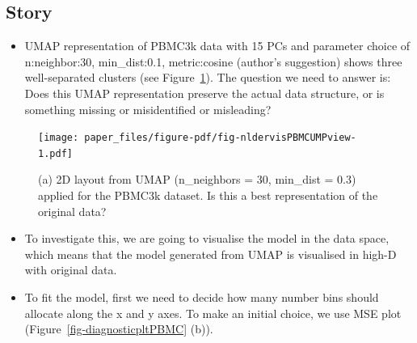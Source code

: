 \documentclass[
  12pt]{article}
\providecommand{\tightlist}{%
  \setlength{\itemsep}{0pt}\setlength{\parskip}{0pt}}\usepackage{longtable,booktabs,array}
\begin{document}
\hypertarget{story}{%
\subsection{Story}\label{story}}

\begin{itemize}
\tightlist
\item
  UMAP representation of PBMC3k data with 15 PCs and parameter choice of
  n:neighbor:30, min\_dist:0.1, metric:cosine (author's suggestion)
  shows three well-separated clusters (see
  Figure~\ref{fig-nldervisPBMCUMPview}). The question we need to answer
  is: Does this UMAP representation preserve the actual data structure,
  or is something missing or misidentified or misleading?
\end{itemize}

\begin{figure}[H]

{\centering \texttt{[image: paper\_files/figure-pdf/fig-nldervisPBMCUMPview-1.pdf]}

}

\caption{\label{fig-nldervisPBMCUMPview}(a) 2D layout from UMAP
(n\_neighbors = 30, min\_dist = 0.3) applied for the PBMC3k dataset. Is
this a best representation of the original data?}

\end{figure}

\begin{itemize}
\item
  To investigate this, we are going to visualise the model in the data
  space, which means that the model generated from UMAP is visualised in
  high-D with original data.
\item
  To fit the model, first we need to decide how many number bins should
  allocate along the x and y axes. To make an initial choice, we use MSE
  plot (Figure~\ref{fig-diagnosticpltPBMC} (b)).
\end{itemize}
\end{document}
